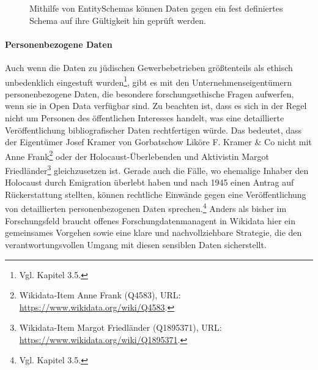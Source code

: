 \begin{figure}[h]
    \centering
    \caption{Mithilfe von EntitySchemas können Daten gegen ein fest definiertes Schema auf ihre Gültigkeit hin geprüft werden.}
    \label{fig:x cubed graph}
\end{figure}

\paragraph{Personenbezogene Daten}

Auch wenn die Daten zu jüdischen Gewerbebetrieben größtenteils als ethisch unbedenklich eingestuft wurden\footnote{Vgl. Kapitel 3.5.}, gibt es mit den Unternehmenseigentümern personenbezogene Daten, die besondere forschungsethische Fragen aufwerfen, wenn sie in Open Data verfügbar sind. Zu beachten ist, dass es sich in der Regel nicht um Personen des öffentlichen Interesses handelt, was eine detaillierte Veröffentlichung bibliografischer Daten rechtfertigen würde. Das bedeutet, dass der Eigentümer Josef Kramer von Gorbatschow Liköre F. Kramer \& Co nicht mit Anne Frank\footnote{Wikidata-Item Anne Frank (Q4583), URL: \url{https://www.wikidata.org/wiki/Q4583}.} oder der Holocaust-Überlebenden und Aktivistin Margot Friedländer\footnote{Wikidata-Item Margot Friedländer (Q1895371), URL: \url{https://www.wikidata.org/wiki/Q1895371}.} gleichzusetzen ist. Gerade auch die Fälle, wo ehemalige Inhaber den Holocaust durch Emigration überlebt haben und nach 1945 einen Antrag auf Rückerstattung stellten, können rechtliche Einwände gegen eine Veröffentlichung von detaillierten personenbezogenen Daten sprechen.\footnote{Vgl. Kapitel 3.5.} Anders als bisher im Forschungsfeld braucht offenes Forschungdatenmanagent in Wikidata hier ein gemeinsames Vorgehen sowie eine klare und nachvollziehbare Strategie, die den verantwortungsvollen Umgang mit diesen sensiblen Daten sicherstellt. 

